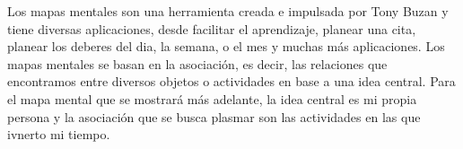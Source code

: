 Los mapas mentales son una herramienta creada e impulsada por Tony Buzan y tiene diversas aplicaciones,
desde facilitar el aprendizaje, planear una cita, planear los deberes del dia, la semana, o el mes y
muchas más aplicaciones. Los mapas mentales se basan en la asociación, es decir, las relaciones que
encontramos entre diversos objetos o actividades en base a una idea central. Para el mapa mental que se
mostrará más adelante, la idea central es mi propia persona y la asociación que se busca plasmar son las
actividades en las que ivnerto mi tiempo.